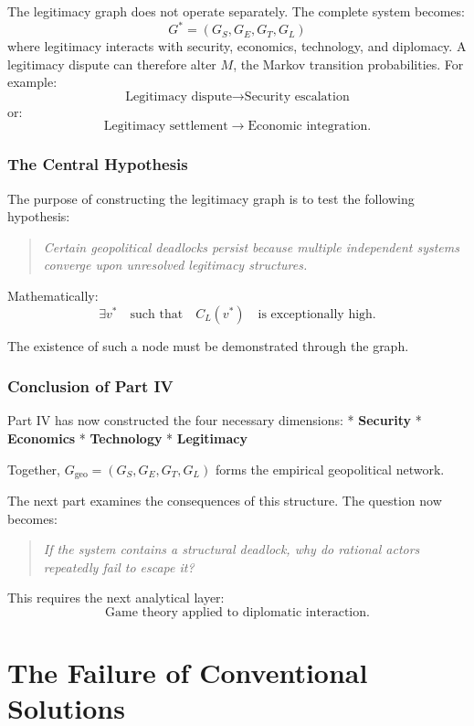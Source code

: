 \documentclass[11pt,openany]{book}
\theoremstyle{plain}
\theoremstyle{definition}
\begin{document}
The legitimacy graph does not operate separately. The complete system becomes:
\[
G^* = (G_S, G_E, G_T, G_L)
\]
where legitimacy interacts with security, economics, technology, and diplomacy. A legitimacy dispute can therefore alter \(M\), the Markov transition probabilities. For example:
\[
\text{Legitimacy dispute} \longrightarrow \text{Security escalation}
\]
or:
\[
\text{Legitimacy settlement} \longrightarrow \text{Economic integration}.
\]

\section*{The Central Hypothesis}

The purpose of constructing the legitimacy graph is to test the following hypothesis:
\begin{quote}
\textit{Certain geopolitical deadlocks persist because multiple independent systems converge upon unresolved legitimacy structures.}
\end{quote}

Mathematically:
\[
\exists v^* \quad \text{such that} \quad C_L(v^*) \quad \text{is exceptionally high.}
\]

The existence of such a node must be demonstrated through the graph.

\section*{Conclusion of Part IV}

Part IV has now constructed the four necessary dimensions:
* \textbf{Security}
* \textbf{Economics}
* \textbf{Technology}
* \textbf{Legitimacy}

Together, \(G_{\text{geo}} = (G_S, G_E, G_T, G_L)\) forms the empirical geopolitical network. 

The next part examines the consequences of this structure. The question now becomes:
\begin{quote}
\textit{If the system contains a structural deadlock, why do rational actors repeatedly fail to escape it?}
\end{quote}

This requires the next analytical layer:
\[
\boxed{
\text{Game theory applied to diplomatic interaction.}
}
\]


\part{The Failure of Conventional Solutions}
\end{document}
